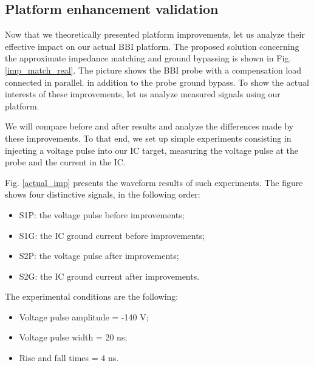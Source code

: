 	\subsection{Platform enhancement validation}
		
		Now that we theoretically presented platform improvements, let us analyze their effective impact on our actual BBI platform.
		The proposed solution concerning the approximate impedance matching and ground bypassing is shown in Fig. \ref{imp_match_real}.
		The picture shows the BBI probe with a compensation load connected in parallel. in addition to the probe ground bypass.
		To show the actual interests of these improvements, let us analyze measured signals using our platform.

		We will compare before and after results and analyze the differences made by these improvements.
		To that end, we set up simple experiments consisting in injecting a voltage pulse into our IC target, measuring the voltage pulse at the probe and the current in the IC.
		
		Fig. \ref{actual_imp} presents the waveform results of such experiments.
		The figure shows four distinctive signals, in the following order:
		\begin{itemize}
			\item S1P: the voltage pulse before improvements;
			\item S1G: the IC ground current before improvements;
			\item S2P: the voltage pulse after improvements;
			\item S2G: the IC ground current after improvements.
		\end{itemize}
		The experimental conditions are the following:
		\begin{itemize}
			\item Voltage pulse amplitude = -140 V;
			\item Voltage pulse width = 20 ns;
			\item Rise and fall times = 4 ns.
		\end{itemize}

